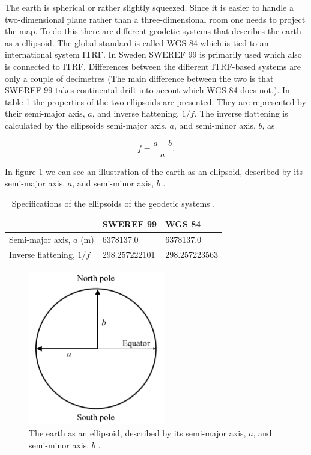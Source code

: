 The earth is spherical or rather slightly squeezed. Since it is easier to handle a two-dimensional plane rather than a three-dimensional room one needs to project the map. To do this there are different geodetic systems that describes the earth as a ellipsoid. The global standard is called WGS 84 which is tied to an international system ITRF. In Sweden SWEREF 99 is primarily used which also is connected to ITRF. Differences between the different ITRF-based systems are only a couple of decimetres (The main difference between the two is that SWEREF 99 takes continental drift into accont which WGS 84 does not.)\citep{lant1}. In table \ref{tab:geodetic} the properties of the two ellipsoids are presented. They are represented by their semi-major axis, $a$, and inverse flattening, $1/f$. The inverse flattening is calculated by the ellipsoids semi-major axis, $a$, and semi-minor axis, $b$, as

\begin{equation}
    f = \frac{a-b}{a}.
\end{equation}

In figure \ref{fig:data/earth} we can see an illustration of the earth as an ellipsoid, described by its semi-major axis, $a$, and semi-minor axis, $b$ \citep{lant2}. 

\begin{table}[H]
\centering
\caption{Specifications of the ellipsoids of the geodetic systems \citep{lant2}\citep{lant3}.}
\label{tab:geodetic}
\begin{tabular}{lll}
                        & SWEREF 99     & WGS 84        \\ \hline
Semi-major axis, $a$ (m)  & 6378137.0     & 6378137.0     \\
Inverse flattening, $1/f$ & 298.257222101 & 298.257223563 \\ \hline
\end{tabular}
\end{table}


\begin{figure}[H]
    \centering
    \includegraphics[width=6cm]{Figures/Data/earth.png}
    \caption{The earth as an ellipsoid, described by its semi-major axis, $a$, and semi-minor axis, $b$ \citep{lant2}.}
    \label{fig:data/earth}
\end{figure}


